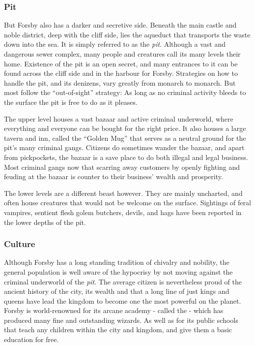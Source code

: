 \subsubsection{Pit}
\label{sec:Pit}

But Forsby also has a darker and secretive side. Beneath the main castle and
noble district, deep with the cliff side, lies the aqueduct that transports
the waste down into the sea. It is simply referred to as the \emph{pit}.
Although a vast and dangerous sewer complex, many people and creatures call
its many levels their home. Existence of the pit is an open secret, and many
entrances to it can be found across the cliff side and in the harbour for
Forsby. Strategies on how to handle the pit, and its denizens, vary greatly
from monarch to monarch. But most follow the ``out-of-sight'' strategy: As
long as no criminal activity bleeds to the surface the pit is free to do as
it pleases.

The upper level houses a vast bazaar and active criminal underworld, where
everything and everyone can be bought for the right price. It also houses a
large tavern and inn, called the ``Golden Mug'' that serves as a neutral
ground for the pit's many criminal gangs. Citizens do sometimes wander the
bazaar, and apart from pickpockets, the bazaar is a save place to do both
illegal and legal business. Most criminal gangs now that scarring away
customers by openly fighting and feuding at the bazaar is counter to their
business' wealth and prosperity.

The lower levels are a different beast however. They are mainly uncharted, and
often house creatures that would not be welcome on the surface. Sightings of
feral vampires, sentient flesh golem butchers, devils, and hags have been
reported in the lower depths of the pit.

\subsubsection{Culture}

Although Forsby has a long standing tradition of chivalry and nobility, the
general population is well aware of the hypocrisy by not moving against the
criminal underworld of the \emph{pit}. The average citizen is nevertheless
proud of the ancient history of the city, its wealth and that a long line of
just kings and queens have lead the kingdom to become one the most powerful on
the planet. Forsby is world-renowned for its arcane academy - called the
 - which has produced many fine and
outstanding wizards. As well as for its public schools that teach any children
within the city and kingdom, and give them a basic education for free.

